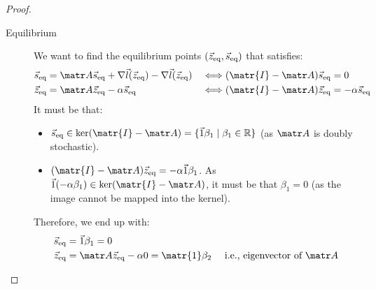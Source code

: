 \begin{subappendices}
\begin{theorem}
\begin{proof}
        \begin{description}
            \item[Equilibrium]
                We want to find the equilibrium points $({\vec{z}}_\text{eq}, {\vec{s}}_\text{eq})$ that satisfies:
                \[
                    \begin{aligned}
                        \s_\text{eq} &= \A \s_\text{eq} + \nabla \vec{l}(\z_\text{eq}) - \nabla \vec{l}(\z_\text{eq}) &\iff& (\matr{I} - \A) \s_\text{eq} = 0 \\
                        \z_\text{eq} &= \A\z_\text{eq} - \alpha \s_\text{eq} &\iff& (\matr{I} - \A) \z_\text{eq} = -\alpha \s_\text{eq} \\
                    \end{aligned}
                \]
                It must be that:
                \begin{itemize}
                    \item $\s_\text{eq} \in \text{ker}(\matr{I} - \A) = \{ \vec{1}\beta_1 \mid \beta_1 \in \R \}$ (as $\A$ is doubly stochastic).
                    \item $(\matr{I} - \A) \z_\text{eq} = - \alpha \vec{1} \beta_1$. As $\vec{1} (-\alpha \beta_1) \in \text{ker}(\matr{I} - \A)$, it must be that $\beta_1 = 0$ (as the image cannot be mapped into the kernel).
                \end{itemize}
                Therefore, we end up with:
                \[
                    \begin{split}
                        \s_\text{eq} &= \vec{1}\beta_1 = 0 \\
                        \z_\text{eq} &= \A\z_\text{eq} - \alpha 0 = \matr{1} \beta_2 \quad \text{ i.e., eigenvector of $\A$} \\
                    \end{split}
                \]


\end{description}
\end{proof}
\end{theorem}
\end{subappendices}
